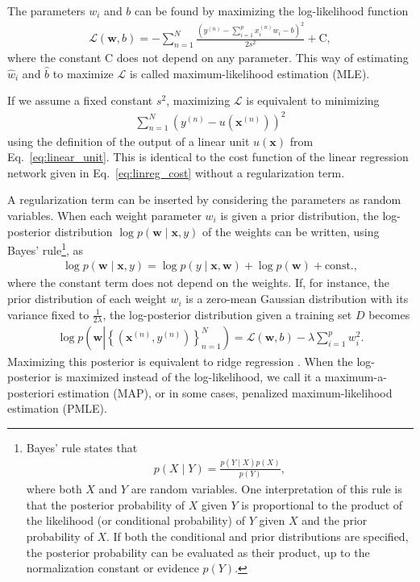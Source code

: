 \documentclass{now}
\newcommand{\vect}[1]{\mathbf{#1}}
\newcommand{\vx}[0]{\vect{x}}
\newcommand{\vw}[0]{\vect{w}}
\newcommand{\LL}[0]{\mathcal{L}}
\begin{document}
The parameters $w_i$ and $b$ can be found by maximizing
the log-likelihood function
\begin{align}
    \label{eq:linreg_ll}
    \LL(\vw, b) = -\sum_{n=1}^N \frac{\left( y^{(n)} -
    \sum_{i=1}^p x_i^{(n)} w_i - b \right)^2}{2 s^2} +
    \text{C},
\end{align}
where the constant $\text{C}$ does not depend on any parameter.
This way of estimating $\hat{w}_i$ and $\hat{b}$ to
maximize $\LL$ is called maximum-likelihood estimation
(MLE).

If we assume a fixed constant $s^2$, maximizing $\LL$ is
equivalent to minimizing
\begin{align*}
    \sum_{n=1}^N \left( y^{(n)} -
    u(\vx^{(n)})\right)^2
\end{align*}
using the definition of the output of a linear unit $u(\vx)$
from Eq.~\eqref{eq:linear_unit}. This is identical to the
cost function of the linear regression network given in
Eq.~\eqref{eq:linreg_cost} without a regularization term. 

A regularization term can be inserted by considering the
parameters as random variables. When each weight parameter
$w_i$ is given a prior distribution, the log-posterior
distribution $\log p(\vw \mid \vx, y)$ of the weights can be
written, using Bayes' rule\footnote{Bayes' rule states
that
\begin{align}
    \label{eq:bayes_rule}
    p(X \mid Y) = \frac{p(Y \mid X) p(X)}{p(Y)},
\end{align}
where both $X$ and $Y$ are random variables. One
interpretation of this rule is that the posterior
probability of $X$ given $Y$ is proportional to the product
of the likelihood (or conditional probability) of $Y$ given
$X$ and the prior probability of $X$. 
If both the
conditional and prior distributions are specified, the
posterior probability can be evaluated as their product, up
to the normalization constant or evidence $p(Y)$.}, as
\begin{align*}
    \log p(\vw \mid \vx, y) = \log p(y \mid \vx, \vw) + \log
    p(\vw) + \text{const.},
\end{align*}
where the constant term does not depend on the weights. If,
for instance, the prior distribution of each weight $w_i$ is
a zero-mean Gaussian distribution with its variance fixed to
$\tfrac{1}{2\lambda}$, the log-posterior distribution given
a training set $D$ becomes
\begin{align*}
    \log p\left(\vw \left| \left\{ (\vx^{(n)}, y^{(n)})
    \right\}_{n=1}^N \right. \right) = \LL(\vw, b) - \lambda
    \sum_{i=1}^p w_i^2.
\end{align*}
Maximizing this posterior is equivalent to ridge regression
\citep{Hoerl1970}. When the log-posterior is maximized
instead of the log-likelihood, we call it a
maximum-a-posteriori estimation
(MAP), or
in some cases, penalized maximum-likelihood estimation
(PMLE).
\end{document}
